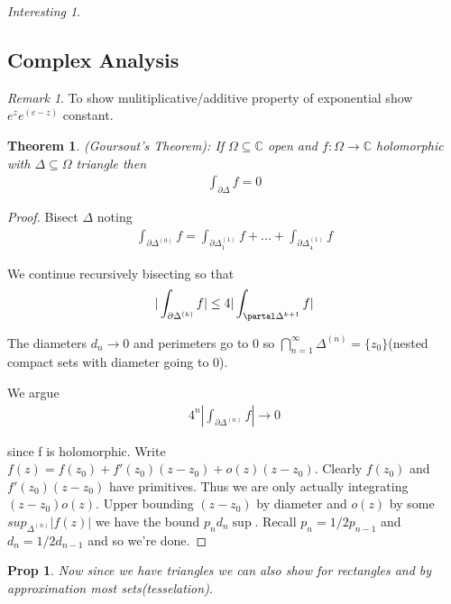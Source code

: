 \documentclass[11pt]{article}
\newcommand{\C}{\mathbb{C}}
\newtheorem{theorem}{Theorem}
\newtheorem{prop}{Prop}
\theoremstyle{remark}
\newtheorem{remark}{Remark}
\newtheorem{interest}{Interesting}
\begin{document}
\begin{interest}
\subsection{Complex Analysis}

\begin{remark}
	To show mulitiplicative/additive property of exponential show $e^ze^(c-z)$ constant.
\end{remark}

\begin{theorem}
	(Goursout's Theorem): If $\Omega \subseteq \C$ open and $f : \Omega \to \C$ holomorphic with $\Delta \subseteq \Omega$ triangle then 
	\begin{align*}
		\int_{\partial \Delta} f = 0
	\end{align*}
\end{theorem}

\begin{proof}
	Bisect $\Delta$ noting
	\begin{align*}
		\int_{\partial \Delta^{(0)}} f = \int_{\partial \Delta^{(1)}_1} f + ... + \int_{\partial \Delta^{(1)}_4} f
	\end{align*}

	We continue recursively bisecting so that
	\begin{align*}
		|\int_{\partial \Delta^{(k)}} f| \leq 4 |\int_{\partal \Delta^{k+1}} f|
	\end{align*}

	The diameters $d_n \to 0$ and perimeters go to 0 so $\bigcap_{n=1}^{\infty} \Delta^{(n)} = \{z_0\}$(nested compact sets with diameter going to 0).

	We argue
	\begin{align*}
		4^n |\int_{\partial \Delta^{(n)}} f| \to 0
	\end{align*}

	since f is holomorphic. Write $f(z) = f(z_0) + f'(z_0)(z-z_0) + o(z)(z-z_0)$. Clearly $f(z_0)$ and $f'(z_0)(z-z_0)$ have primitives. Thus we are only actually integrating $(z-z_0)o(z)$. Upper bounding $(z-z_0)$ by diameter and $o(z)$ by some $sup_{\Delta^{(n)}} |f(z)|$ we have the bound $p_n d_n \sup$. Recall $p_n = 1/2p_{n-1}$ and $d_n = 1/2 d_{n-1}$ and so we're done.
\end{proof}

\begin{prop}
	Now since we have triangles we can also show for rectangles and by approximation most sets(tesselation). 
\end{prop}


\end{interest}
\end{document}
